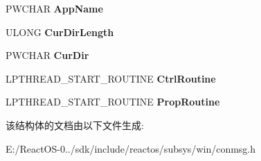 \begin{DoxyCompactItemize}
\mbox{\label{struct___c_o_n_s_o_l_e___a_l_l_o_c_c_o_n_s_o_l_e_ae79ab3c27edc273d5ad96a01e9a15d08}} 
P\+W\+C\+H\+AR {\bfseries App\+Name}
\item 
\mbox{\label{struct___c_o_n_s_o_l_e___a_l_l_o_c_c_o_n_s_o_l_e_a875216b4bb9be1f5677fcde4ec14003f}} 
U\+L\+O\+NG {\bfseries Cur\+Dir\+Length}
\item 
\mbox{\label{struct___c_o_n_s_o_l_e___a_l_l_o_c_c_o_n_s_o_l_e_a375a43f580bee1d8ffb14d4f99fac6c1}} 
P\+W\+C\+H\+AR {\bfseries Cur\+Dir}
\item 
\mbox{\label{struct___c_o_n_s_o_l_e___a_l_l_o_c_c_o_n_s_o_l_e_af73292969bc53768ab32c676e71fc042}} 
L\+P\+T\+H\+R\+E\+A\+D\+\_\+\+S\+T\+A\+R\+T\+\_\+\+R\+O\+U\+T\+I\+NE {\bfseries Ctrl\+Routine}
\item 
\mbox{\label{struct___c_o_n_s_o_l_e___a_l_l_o_c_c_o_n_s_o_l_e_a8ad073b98f79840292bbc0b464ed716f}} 
L\+P\+T\+H\+R\+E\+A\+D\+\_\+\+S\+T\+A\+R\+T\+\_\+\+R\+O\+U\+T\+I\+NE {\bfseries Prop\+Routine}
\end{DoxyCompactItemize}


该结构体的文档由以下文件生成\+:\begin{DoxyCompactItemize}
\item 
E\+:/\+React\+O\+S-\/0../sdk/include/reactos/subsys/win/conmsg.\+h\end{DoxyCompactItemize}
